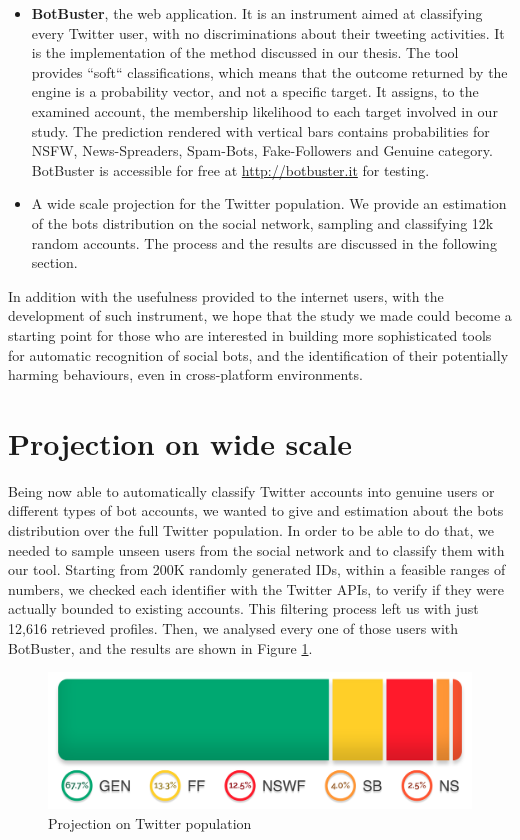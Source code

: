 \begin{itemize}
	\item[\PencilRight] \textbf{BotBuster}, the web application. It is an instrument aimed at classifying every Twitter user, with no discriminations about their tweeting activities. It is the implementation of the method discussed in our thesis. The tool provides ``soft`` classifications, which means that the outcome returned by the engine is a probability vector, and not a specific target. It assigns, to the examined account, the membership likelihood to each target involved in our study.
	The prediction rendered with vertical bars contains probabilities for NSFW, News-Spreaders, Spam-Bots, Fake-Followers and Genuine category.
	BotBuster is accessible for free at \url{http://botbuster.it} for testing.
	
	\item[\PencilRight] A wide scale projection for the Twitter population.
	We provide an estimation of the bots distribution on the social network, sampling and classifying 12k random accounts. The process and the results are discussed in the following section.
\end{itemize}

In addition with the usefulness provided to the internet users, with the development of such instrument, we hope that the study we made could become a starting point for those who are interested in building more sophisticated tools for automatic recognition of social bots, and the identification of their potentially harming behaviours, even in cross-platform environments.

\section{Projection on wide scale}
Being now able to automatically classify Twitter accounts into genuine users or different types of bot accounts, we wanted to give and estimation about the bots distribution over the full Twitter population. In order to be able to do that, we needed to sample unseen users from the social network and to classify them with our tool.
Starting from 200K randomly generated IDs, within a feasible ranges of numbers, we checked each identifier with the Twitter APIs, to verify if they were actually bounded to existing accounts.
This filtering process left us with just 12,616 retrieved profiles.
Then, we analysed every one of those users with BotBuster, and the results are shown in Figure \ref{fig:projection}.
\begin{figure}[htp!]
	\begin{center}
		\includegraphics[width=\columnwidth]{chapter8/figure/projection.png}
	\end{center}
	\caption{Projection on Twitter population}
	\label{fig:projection}
\end{figure}

